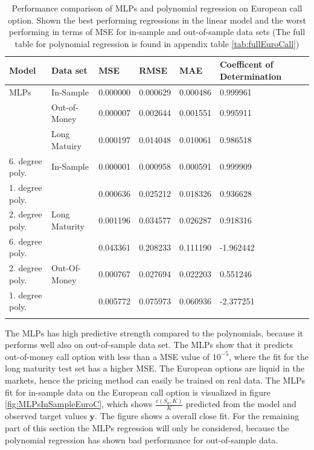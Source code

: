 \begin{table}[th]
\caption{Performance comparison of MLPs and polynomial regression on European call option. Shown the best performing regressions in the linear model and the worst performing in terms of MSE for in-sample and out-of-sample data sets (The full table for polynomial regression is found in appendix table \ref{tab:fullEuroCall})}
\label{tab:ComparePolyWithMLPS}
\centering
\begin{tabular}{l l l l l l l }
\toprule
\textbf{Model} & \textbf{Data set} & \textbf{MSE} & \textbf{RMSE} & \textbf{MAE} & \textbf{Coefficent of Determination} \\
\midrule
MLPs & In-Sample & 0.000000 & 0.000629 & 0.000486 & 0.999961\\
& Out-of-Money & 0.000007 & 0.002644 & 0.001551 & 0.995911\\
& Long Matuiry & 0.000197 & 0.014048 & 0.010061 & 0.986518\\
6. degree poly. & In-Sample & 0.000001 & 0.000958 & 0.000591 & 0.999909\\
1. degree poly. &  & 0.000636 & 0.025212 & 0.018326 & 0.936628\\
2. degree poly. & Long Maturity & 0.001196 & 0.034577 & 0.026287 & 0.918316\\
6. degree poly. &  & 0.043361 & 0.208233 & 0.111190 & -1.962442\\
2. degree poly. & Out-Of-Money & 0.000767 & 0.027694 & 0.022203 & 0.551246\\
1. degree poly. &  & 0.005772 & 0.075973 & 0.060936 & -2.377251\\
\bottomrule\\
\end{tabular}
\end{table}

The MLPs has high predictive strength compared to the polynomials, because it performs well also on out-of-sample data set. The MLPs show that it predicts out-of-money call option with less than a MSE value of $10^{-5}$, where the fit for the long maturity test set has a higher MSE. The European options are liquid in the markets, hence the pricing method can easily be trained on real data. The MLPs fit for in-sample data on the European call option is visualized in figure \ref{fig:MLPsInSampleEuroC}, which shows $\frac{c(S_0,K)}{K}$ predicted from the model and observed target values $\bm{y}$. The figure shows a overall close fit. For the remaining part of this section the MLPs regression will only be considered, because the polynomial regression has shown bad performance for out-of-sample data.

